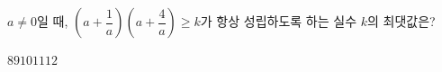 $a\ne 0$일 때, $\left(a+\dfrac{1}{a}\right)\left(a+\dfrac{4}{a}\right)\ge k$가 항상 성립하도록 하는 실수 $k$의 최댓값은?
\begin{choices32}{$8$}{$9$}{$10$}{$11$}{$12$}\end{choices32}
